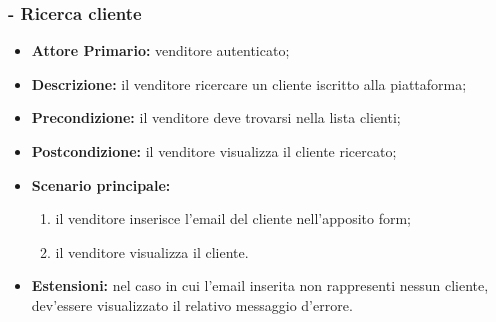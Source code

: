 \stepsubUserCase
\subsubsection{- Ricerca cliente}
\begin{itemize}
    \item \textbf{Attore Primario:} venditore autenticato;
    \item \textbf{Descrizione:} il venditore ricercare un cliente iscritto alla piattaforma;
    \item \textbf{Precondizione:} il venditore deve trovarsi nella lista clienti;
    \item \textbf{Postcondizione:} il venditore visualizza il cliente ricercato;
    \item \textbf{Scenario principale:}
          \begin{enumerate}
              \item il venditore inserisce l'email del cliente nell'apposito form;
              \item il venditore visualizza il cliente.
          \end{enumerate}
    \item \textbf{Estensioni:} nel caso in cui l'email inserita non rappresenti nessun cliente, dev'essere visualizzato il relativo messaggio d'errore.
\end{itemize}



\stepUserCase
